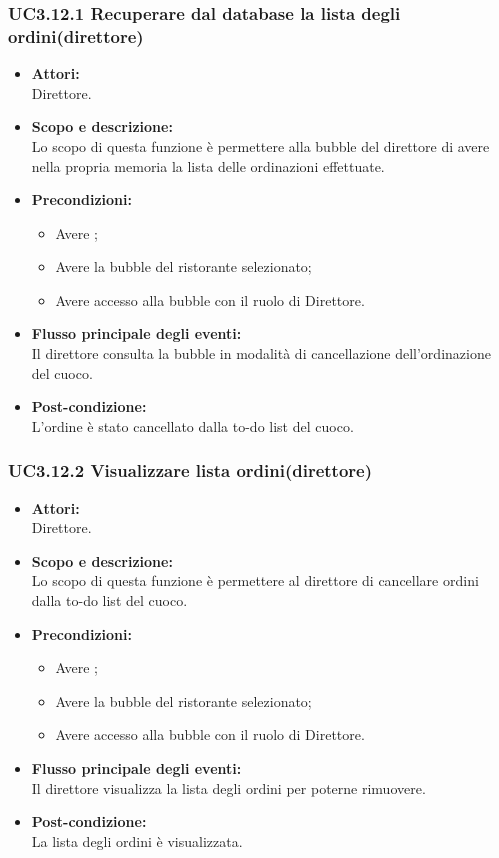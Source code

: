 \subsubsection{UC3.12.1 Recuperare dal database la lista degli ordini(direttore)} \label{UC3.12.1}

\begin{itemize}
	\item \textbf{Attori:}
	\\Direttore.
	\item \textbf{Scopo e descrizione:} 
	\\Lo scopo di questa funzione è permettere alla bubble del direttore di avere nella propria memoria la lista delle ordinazioni effettuate.
	\item \textbf{Precondizioni:}
	\begin{itemize}
		\item Avere ;
		\item Avere la bubble del ristorante selezionato;
		\item Avere accesso alla bubble con il ruolo di Direttore.
	\end{itemize}
	\item \textbf{Flusso principale degli eventi:}
	\\Il direttore consulta la bubble in modalità di cancellazione dell’ordinazione del cuoco.
	\item \textbf{Post-condizione:}
	\\L’ordine è stato cancellato dalla to-do list del cuoco.
\end{itemize}

\subsubsection{UC3.12.2 Visualizzare lista ordini(direttore)} \label{UC3.12.2}

\begin{itemize}
	\item \textbf{Attori:}
	\\Direttore.
	\item \textbf{Scopo e descrizione:} 
	\\Lo scopo di questa funzione è permettere al direttore di cancellare ordini dalla to-do list del cuoco.
	\item \textbf{Precondizioni:}
	\begin{itemize}
		\item Avere ;
		\item Avere la bubble del ristorante selezionato;
		\item Avere accesso alla bubble con il ruolo di Direttore.
	\end{itemize}
	\item \textbf{Flusso principale degli eventi:}
	\\Il direttore visualizza la lista degli ordini per poterne rimuovere.
	\item \textbf{Post-condizione:}
	\\La lista degli ordini è visualizzata.
\end{itemize}

